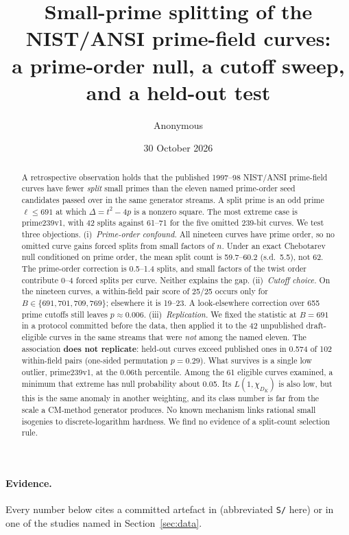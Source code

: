 \documentclass[11pt,a4paper]{article}
\title{Small-prime splitting of the NIST/ANSI prime-field curves:\\
a prime-order null, a cutoff sweep, and a held-out test}
\author{Anonymous}
\date{30 October 2026}
\theoremstyle{plain}
\newcommand{\Sdir}{\texttt{S/}}
\begin{document}
\maketitle

\begin{abstract}
A retrospective observation holds that the published 1997--98 NIST/ANSI
prime-field curves have fewer \emph{split} small primes than the eleven named
prime-order seed candidates passed over in the same generator streams. A split
prime is an odd prime $\ell \le 691$ at which $\Delta = t^2 - 4p$ is a nonzero
square. The most extreme case is prime239v1, with 42 splits against 61--71 for
the five omitted 239-bit curves. We test three objections.
(i)~\emph{Prime-order confound.} All nineteen curves have prime order, so no
omitted curve gains forced splits from small factors of $n$. Under an exact
Chebotarev null conditioned on prime order, the mean split count is
59.7--60.2 (s.d.\ 5.5), not 62. The prime-order correction is 0.5--1.4
splits, and small factors of the twist order contribute 0--4 forced splits per
curve. Neither explains the gap.
(ii)~\emph{Cutoff choice.} On the nineteen curves, a within-field pair score of
25/25 occurs only for $B \in \{691, 701, 709, 769\}$; elsewhere it is 19--23.
A look-elsewhere correction over 655 prime cutoffs still leaves
$p \approx 0.006$.
(iii)~\emph{Replication.} We fixed the statistic at $B = 691$ in a protocol
committed before the data, then applied it to the 42 unpublished
draft-eligible curves in the same streams that were \emph{not} among the named
eleven. The association \textbf{does not replicate}: held-out curves exceed
published ones in 0.574 of 102 within-field pairs (one-sided permutation
$p = 0.29$).
What survives is a single low outlier, prime239v1, at the 0.06th percentile.
Among the 61 eligible curves examined, a minimum that extreme has null
probability about 0.05. Its $L(1,\chi_{D_K})$ is also low, but this is the
same anomaly in another weighting, and its class number is far from the scale
a CM-method generator produces. No known mechanism links rational small
isogenies to discrete-logarithm hardness. We find no evidence of a split-count
selection rule.
\end{abstract}

\paragraph{Evidence.} Every number below cites a committed artefact in
(abbreviated \Sdir{} here) or in one of the studies named in Section~\ref{sec:data}.
\end{document}
